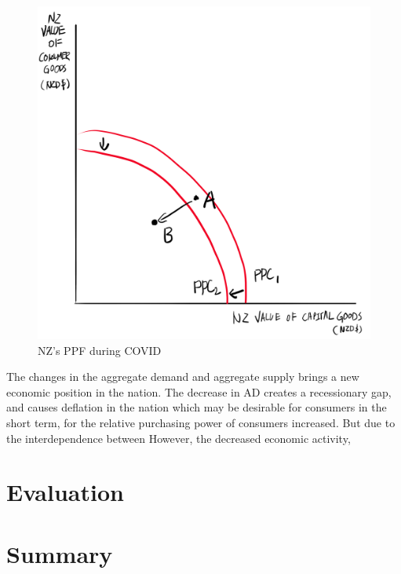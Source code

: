 \documentclass[a4paper,12pt]{article}
\begin{document}
\begin{figure}[H]
    \centering
    \includegraphics[scale=0.6]{assets/ppf.png}
    \caption{NZ's PPF during COVID}
    \label{fig:ppf}
\end{figure}

The changes in the aggregate demand and aggregate supply brings a new economic position in the nation. The decrease in AD creates a recessionary gap, and causes deflation in the nation which may be desirable for consumers in the short term, for the relative purchasing power of consumers increased. But due to the interdependence between
However, the decreased economic activity,


\section*{Evaluation}


\section*{Summary}

\end{document}
